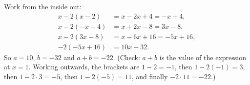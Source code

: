 Work from the inside out:
\[
\begin{aligned}
x-2(x-2)&=x-2x+4=-x+4,\\
x-2(-x+4)&=x+2x-8=3x-8,\\
x-2(3x-8)&=x-6x+16=-5x+16,\\
-2(-5x+16)&=10x-32 .
\end{aligned}
\]
So $a=10$, $b=-32$ and $a+b=\boxed{-22}$. (Check: $a+b$ is the value of the expression at $x=1$. Working outwards, the brackets are $1-2=-1$, then $1-2(-1)=3$, then $1-2\cdot3=-5$, then $1-2(-5)=11$, and finally $-2\cdot11=-22$.)
